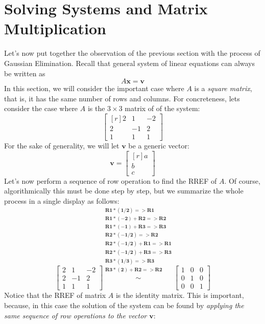 \documentclass[12pt]{article}
\begin{document}
\section{Solving Systems and Matrix Multiplication}
Let's now put together the observation of the previous section with the process of Gaussian Elimination. 
Recall that general system of linear equations can always be written as
\[
A\mathbf{x}=\mathbf{v}
\]
In this section, we will consider the important case where $A$ is a \emph{square matrix}, that is, it has the same number of rows and columns.
For concreteness, lets consider the case where $A$ is the $3\times3$ matrix of of the system:
\[
\begin{bmatrix*}[r]2 & 1 & -2\\2 & -1 & 2\\1 & 1 & 1\end{bmatrix*}
\]
For the sake of generality, we will let $\mathbf{v}$ be a generic vector:
\[
\mathbf{v}=
\begin{bmatrix*}[r]a\\b\\c\end{bmatrix*}
\]
Let's now perform a sequence of row operation to find the RREF of $A$. Of course, algorithmically this must be done step by step, but we summarize the whole process in a single display as follows:
\[
\begin{bmatrix}2 & 1 & -2\\2 & -1 & 2\\1 & 1 & 1\end{bmatrix}
\stackrel
{
\begin{matrix}
\scriptstyle{\mathbf{R1*(1/2)=>R1}}\\
\scriptstyle{\mathbf{R1*(-2)+R2=>R2}}\\
\scriptstyle{\mathbf{R1*(-1)+R3=>R3}}\\
\scriptstyle{\mathbf{R2*(-1/2)=>R2}}\\
\scriptstyle{\mathbf{R2*(-1/2)+R1=>R1}}\\
\scriptstyle{\mathbf{R2*(-1/2)+R3=>R3}}\\
\scriptstyle{\mathbf{R3*(1/3)=>R3}}\\
\scriptstyle{\mathbf{R3*(2)+R2=>R2}}\\
\end{matrix}
}
{\sim}
\begin{bmatrix}1&0&0\\0&1&0\\0&0&1\end{bmatrix}
\]
Notice that the RREF of matrix $A$ is the identity matrix. This is important, because, in this case the solution of the system can be found by \emph{applying the same sequence of row operations to the vector $\mathbf{v}$}:
\end{document}
